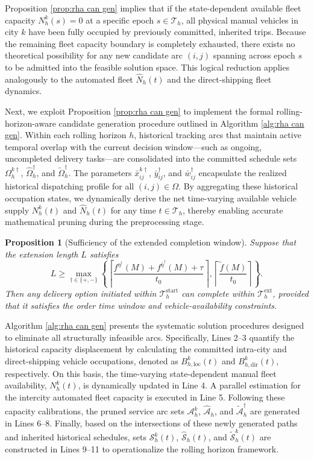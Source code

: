 \documentclass[10pt, reqno]{amsart}
\newtheorem{proposition}[theorem]{Proposition}
\begin{document}
Proposition \ref{prop:rha can gen} implies that if the state-dependent available fleet capacity $N^k_h(s) = 0$ at a specific epoch $s \in \mathcal{T}_h$, all physical manual vehicles in city $k$ have been fully occupied by previously committed, inherited trips. Because the remaining fleet capacity boundary is completely exhausted, there exists no theoretical possibility for any new candidate arc $(i,j)$ spanning across epoch $s$ to be admitted into the feasible solution space. This logical reduction applies analogously to the automated fleet $\widehat{N}_h(t)$ and the direct-shipping fleet dynamics.

Next, we exploit Proposition \ref{prop:rha can gen} to implement the formal rolling-horizon-aware candidate generation procedure outlined in Algorithm \ref{alg:rha can gen}. Within each rolling horizon $h$, historical tracking arcs that maintain active temporal overlap with the current decision window---such as ongoing, uncompleted delivery tasks---are consolidated into the committed schedule sets $\Omega_h^{k\dagger}$, $\widehat{\Omega}_h^\dagger$, and $\widetilde{\Omega}_h^\dagger$. The parameters $\bar{x}_{ij}^{k\dagger}$, $\bar{y}_{ij}^{\dagger}$, and $\bar{w}_{ij}^{\dagger}$ encapsulate the realized historical dispatching profile for all $(i,j) \in \Omega$. By aggregating these historical occupation states, we dynamically derive the net time-varying available vehicle supply $N_h^k(t)$ and $\widehat{N}_h(t)$ for any time $t \in \mathcal{T}_h$, thereby enabling accurate mathematical pruning during the preprocessing stage.
\begin{proposition}[Sufficiency of the extended completion window]
Suppose that the extension length $L$ satisfies
\[
L\ge
\max_{\dagger\in\{+,-\}}
\left\{
\left\lceil
\frac{f^{\eta^\dagger}(M)+f^{\bar\eta^\dagger}(M)+\tau}{t_0}
\right\rceil,
\left\lceil
\frac{\widetilde f(M)}{t_0}
\right\rceil
\right\}.
\]
Then any delivery option initiated within $\mathcal T_h^{\mathrm{start}}$ can complete within $\mathcal T_h^{\mathrm{ext}}$, provided that it satisfies the order time window and vehicle-availability constraints.
\end{proposition}
Algorithm \ref{alg:rha can gen} presents the systematic solution procedures designed to eliminate all structurally infeasible arcs. Specifically, Lines 2--3 quantify the historical capacity displacement by calculating the committed intra-city and direct-shipping vehicle occupations, denoted as $B_{h,\mathrm{loc}}^k(t)$ and $B_{h,\mathrm{dir}}^k(t)$, respectively. On this basis, the time-varying state-dependent manual fleet availability, $N^k_h(t)$, is dynamically updated in Line 4. A parallel estimation for the intercity automated fleet capacity is executed in Line 5. Following these capacity calibrations, the pruned service arc sets $\mathcal{A}_h^k$, $\widehat{\mathcal{A}}_h$, and $\widetilde{\mathcal{A}}_h^{\dagger}$ are generated in Lines 6--8. Finally, based on the intersections of these newly generated paths and inherited historical schedules, sets $\mathcal{S}_h^k(t)$, $\widehat{\mathcal{S}}_h(t)$, and $\widetilde{\mathcal{S}}_h^k(t)$ are constructed in Lines 9--11 to operationalize the rolling horizon framework.
\end{document}
